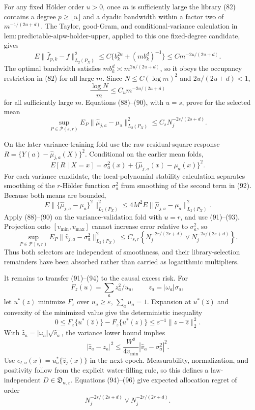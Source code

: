 For any fixed Hölder order \(u>0\), once \(m\) is sufficiently large the library (82) contains a degree \(p\geq\lfloor u\rfloor\) and a dyadic bandwidth within a factor two of \(m^{-1/(2u+d)}\). The Taylor, good-Gram, and conditional-variance calculation in \(\mathrm{lem{:}predictable\text{-}aipw\text{-}holder\text{-}upper}\), applied to this one fixed-degree candidate, gives
\[
E\|\widehat f_{p,k}-f\|_{L_2(P_X)}^2
\leq C\{b_k^{2u}+(mb_k^d)^{-1}\}
\leq C m^{-2u/(2u+d)}.
\tag{89}
\]
The optimal bandwidth satisfies \(mb_k^d\asymp m^{2u/(2u+d)}\), so it obeys the occupancy restriction in (82) for all large \(m\). Since \(N\leq C(\log m)^2\) and \(2u/(2u+d)<1\),
\[
\frac{\log N}{m}
\leq C_u m^{-2u/(2u+d)}
\tag{90}
\]
for all sufficiently large \(m\). Equations (88)--(90), with \(u=s\), prove for the selected mean
\[
\sup_{P\in\mathcal P(s,r)}
E_P\|\widehat\mu_{j,a}-\mu_a\|_{L_2(P_X)}^2
\leq C_sN_j^{-2s/(2s+d)}.
\tag{91}
\]

On the later variance-training fold use the raw residual-square response \(R=\{Y(a)-\widehat\mu_{j,a}(X)\}^2\). Conditional on the earlier mean folds,
\[
E[R\mid X=x]
=\sigma_a^2(x)+\{\widehat\mu_{j,a}(x)-\mu_a(x)\}^2.
\tag{92}
\]
For each variance candidate, the local-polynomial stability calculation separates smoothing of the \(r\)-Hölder function \(\sigma_a^2\) from smoothing of the second term in (92). Because both means are bounded,
\[
E\|\{\widehat\mu_{j,a}-\mu_a\}^2\|_{L_2(P_X)}^2
\leq4M^2E\|\widehat\mu_{j,a}-\mu_a\|_{L_2(P_X)}^2.
\tag{93}
\]
Apply (88)--(90) on the variance-validation fold with \(u=r\), and use (91)--(93). Projection onto \([v_{\min},v_{\max}]\) cannot increase error relative to \(\sigma_a^2\), so
\[
\sup_{P\in\mathcal P(s,r)}
E_P\|\widehat v_{j,a}-\sigma_a^2\|_{L_2(P_X)}^2
\leq C_{s,r}\left\{
N_j^{-2r/(2r+d)}\vee N_j^{-2s/(2s+d)}
\right\}.
\tag{94}
\]
Thus both selectors are independent of smoothness, and their library-selection remainders have been absorbed rather than carried as logarithmic multipliers.

It remains to transfer (91)--(94) to the causal excess risk. For
\[
F_z(u)=\sum_a z_a^2/u_a,
\qquad z_a=|\omega_a|\sigma_a,
\]
let \(u^*(z)\) minimize \(F_z\) over \(u_a\geq\varepsilon\), \(\sum_a u_a=1\). Expansion at \(u^*(\widehat z)\) and convexity of the minimized value give the deterministic inequality
\[
0\leq F_z\{u^*(\widehat z)\}-F_z\{u^*(z)\}
\leq\varepsilon^{-1}\|z-\widehat z\|_2^2.
\tag{95}
\]
With \(\widehat z_a=|\omega_a|\sqrt{\widehat v_a}\), the variance lower bound implies
\[
|\widehat z_a-z_a|^2
\leq\frac{W^2}{4v_{\min}}|\widehat v_a-\sigma_a^2|^2.
\tag{96}
\]
Use \(e_{t,a}(x)=u_a^*\{\widehat z_j(x)\}\) in the next epoch. Measurability, normalization, and positivity follow from the explicit water-filling rule, so this defines a law-independent \(D\in\mathfrak D_{n,\varepsilon}\). Equations (94)--(96) give expected allocation regret of order
\[
N_j^{-2s/(2s+d)}\vee N_j^{-2r/(2r+d)}.
\tag{97}
\]


